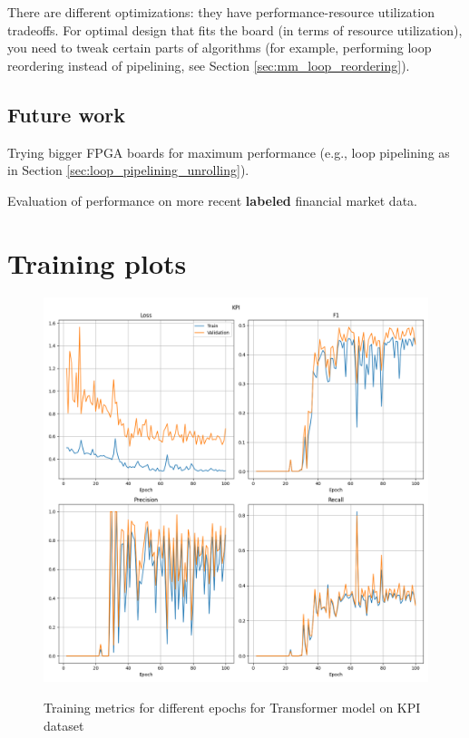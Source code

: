 \documentclass[a4paper, twoside]{report}
\theoremstyle{definition}
\numberwithin{equation}{section}
\begin{document}
There are different optimizations: they have performance-resource utilization tradeoffs.
For optimal design that fits the board (in terms of resource utilization),
you need to tweak certain parts of algorithms (for example, performing loop
reordering instead of pipelining, see Section \ref{sec:mm_loop_reordering}).

\section{Future work}
Trying bigger FPGA boards for maximum performance (e.g., loop pipelining as in Section \ref{sec:loop_pipelining_unrolling}).

Evaluation of performance on more recent \textbf{labeled} financial market data.


\newpage
\appendix
\chapter{Training plots} \label{app:training_plots}

\begin{figure}[h!]
    \centering
    \caption{Training metrics for different epochs for Transformer model on KPI dataset}
    \includegraphics[width=\textwidth]{plots/Transformer_KPI.png}
    \label{fig:Transformer_KPI_training}
\end{figure}
\end{document}

